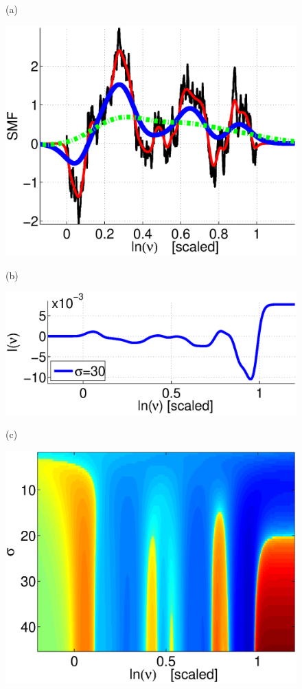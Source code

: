 \documentclass[aps,pre,floats,floatfix,twocolumn]{revtex4}
\begin{document}
\begin{figure}

(a)

\includegraphics[width=\hsize]{SMF_RW.eps}

\vspace*{5mm}

(b)

\includegraphics[width=\hsize]{IvsNu_sigma30.eps}

\vspace*{5mm}

(c)

\includegraphics[width=\hsize]{I_sig_tau.eps}


\end{figure}
\end{document}
